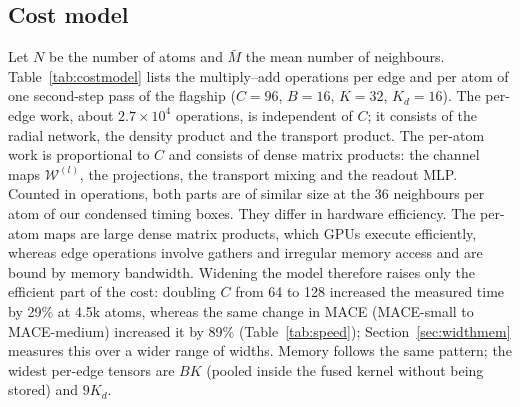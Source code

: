 \documentclass[journal=jctcce,manuscript=article,layout=traditional]{achemso}
\begin{document}
\subsection{Cost model}
\label{sec:costmodel}
Let $N$ be the number of atoms and $\bar M$ the mean number of neighbours. Table~\ref{tab:costmodel} lists the
multiply--add operations per edge and per atom of one second-step pass of the flagship ($C=96$, $B=16$, $K=32$,
$K_d=16$). The per-edge work, about $2.7\times10^4$ operations, is independent of $C$; it consists of the radial
network, the density product and the transport product. The per-atom work is proportional to $C$ and consists of
dense matrix products: the channel maps $\mathcal W^{(l)}$, the projections, the transport mixing and the readout
MLP. Counted in operations, both parts are of similar size at the 36 neighbours per atom of our condensed timing
boxes. They differ in hardware efficiency. The per-atom maps are large dense matrix products, which GPUs execute
efficiently, whereas edge operations involve gathers and irregular memory access and are bound by
memory bandwidth. Widening the model therefore raises only the efficient part of the cost: doubling $C$ from 64 to
128 increased the measured time by 29\% at 4.5k atoms, whereas the same change in MACE (MACE-small to
MACE-medium) increased it by 89\% (Table~\ref{tab:speed}); Section~\ref{sec:widthmem} measures this over a wider
range of widths. Memory follows the same pattern; the widest per-edge tensors are $BK$ (pooled inside the fused
kernel without being stored) and $9K_d$.
\end{document}
